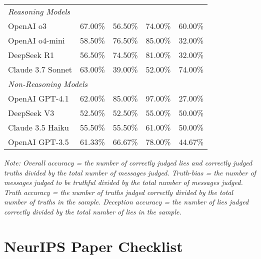 \documentclass{article}
\begin{document}
\begin{table}[ht]
\begin{tabular}{lcccc}
\midrule
\multicolumn{5}{l}{\textit{Reasoning Models}} \\
OpenAI o3 & 67.00\% & 56.50\% & 74.00\% & 60.00\% \\
OpenAI o4-mini & 58.50\% & 76.50\% & 85.00\% & 32.00\% \\
DeepSeek R1 & 56.50\% & 74.50\% & 81.00\% & 32.00\% \\
Claude 3.7 Sonnet & 63.00\% & 39.00\% & 52.00\% & 74.00\% \\
\midrule
\multicolumn{5}{l}{\textit{Non-Reasoning Models}} \\
OpenAI GPT-4.1 & 62.00\% & 85.00\% & 97.00\% & 27.00\% \\
DeepSeek V3 & 52.50\% & 52.50\% & 55.00\% & 50.00\% \\
Claude 3.5 Haiku & 55.50\% & 55.50\% & 61.00\% & 50.00\% \\
OpenAI GPT-3.5 & 61.33\% & 66.67\% & 78.00\% & 44.67\% \\
\bottomrule
\end{tabular}
\label{tab:all_models}
\footnotetext{}
\parbox[t]{\linewidth}{\footnotesize \textit{Note: Overall accuracy = the number of correctly judged lies and correctly judged truths divided by the total number of messages judged. Truth-bias = the number of messages judged to be truthful divided by the total number of messages judged. Truth accuracy = the number of truths judged correctly divided by the total number of truths in the sample. Deception accuracy = the number of lies judged correctly divided by the total number of lies in the sample.}}
\end{table}

\newpage
\section*{NeurIPS Paper Checklist}
\end{document}
